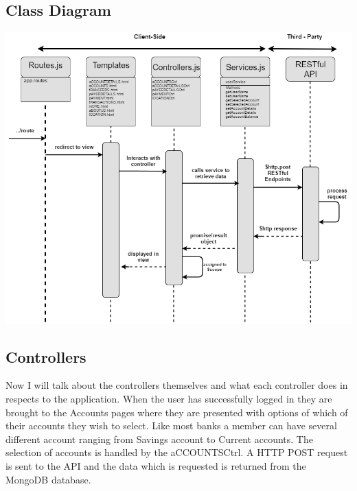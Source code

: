 \subsection{Class Diagram}
\begin{center}    
      \includegraphics[scale=0.5]{img/AngularUml.png}
\end{center}

\subsection{Controllers}
Now I will talk about the controllers themselves and what each controller does in respects to the application. When the user has successfully logged in they are brought to the Accounts pages where they are presented with options of which of their accounts they wish to select. Like most banks a member can have several different account ranging from Savings account to Current accounts.  The selection of accounts is handled by the aCCOUNTSCtrl. A HTTP POST request is sent to the API and the data which is requested is returned from the MongoDB database.\paragraph{}

